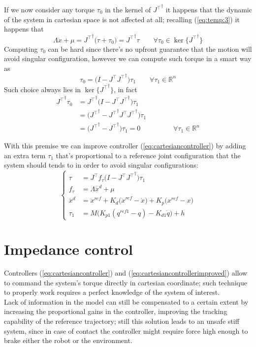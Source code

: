	If we now consider any torque $\tau_0$ in the kernel of ${J^\top}^\dagger$ it happens that the dynamic of the system in cartesian space is not affected at all; recalling (\ref{eq:temp:3}) it happens that
	\[ \Lambda \ddot x + \mu = {J^\top}^\dagger\big(\tau + \tau_0\big) = {J^\top}^\dagger \tau \qquad \forall \tau_0 \in \ker\{{J^\top}^\dagger\} \]
	Computing $\tau_0$ can be hard since there's no upfront guarantee that the motion will avoid singular configuration, however we can compute such torque in a smart way as
	\[ \tau_0 = \big(I - J^\top {J^\top}^\dagger \big) \tau_1 \qquad \forall \tau_1 \in \mathds R^n \]
	Such choice always lies in $\ker\{{J^\top}^\dagger\}$, in fact
	\begin{align*}
		{J^\top}^\dagger \tau_0 & = {J^\top}^\dagger \big(I - J^\top {J^\top}^\dagger\big) \tau_1 \\
		& = \big({J^\top}^\dagger - {J^\top}^\dagger J^\top {J^\top}^\dagger\big) \tau_1 \\
		& = \big({J^\top}^\dagger - {J^\top}^\dagger\big) \tau_1 = 0 \hspace{2cm} \forall \tau_1 \in \mathds R^n
	\end{align*}

	With this premise we can improve controller (\ref{eq:cartesiancontroller}) by adding an extra term $\tau_1$ that's proportional to a reference joint configuration that the system should tends to in order to avoid singular configurations:
	\begin{equation} \label{eq:cartesiancontrollerimproved}
	\begin{cases}
		\tau & = J^\top f_\tau  \big(I - J^\top {J^\top}^\dagger\big) \tau_1\\
		f_\tau & = \Lambda \ddot x^d + \mu \\
		\ddot x^d & = \ddot x^{ref} + K_d\big(\dot x^{ref} - \dot x\big) + K_p\big(x^{ref} - x\big) \\
		\tau_1 & = M\big(K_{p1}(q^{ref1} - q) - K_{d1}\dot q\big) + h
	\end{cases}
	\end{equation}
	 
	
\section{Impedance control}
	Controllers (\ref{eq:cartesiancontroller}) and (\ref{eq:cartesiancontrollerimproved}) allow to command the system's torque directly in cartesian coordinate; such technique to properly work requires a perfect knowledge of the system of interest.\\
	Lack of information in the model can still be compensated to a certain extent by increasing the proportional gains in the controller, improving the tracking capability of the reference trajectory; still this solution leads to an unsafe stiff system, since in case of contact the controller might require force high enough to brake either the robot or the environment.
	

